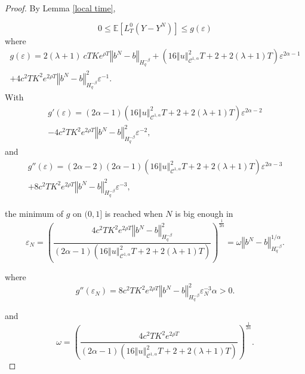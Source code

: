 \documentclass[12pt]{article}
\newcommand{\norme}[1]{\left\Vert #1\right\Vert}
\newcommand{\E}{\mathbb{E}}
\begin{document}
\begin{proof}
    By Lemma \ref{local time},
    
    \begin{equation*}
    0\leq\E\left[L^0_T(Y-Y^N)\right]\leq g(\varepsilon)
    \end{equation*}
    where \begin{multline*}
    g(\varepsilon) = 2(\lambda + 1)\ cT Ke^{\rho T}\norme{b^N-b}_{H^{-\beta}_{q}} + \left(16\norme{u}_{\mathcal{C}^{1,\alpha}}^2 T + 2 + 2(\lambda + 1)T\right) \varepsilon^{2\alpha-1}\\
    + 4c^2T K^2e^{2\rho T}\norme{b^N-b}_{H^{-\beta}_{q}}^2\varepsilon^{-1}.
    \end{multline*}    
    With \begin{multline*}
    g'(\varepsilon)=(2\alpha-1)\left(16\norme{u}_{\mathcal{C}^{1,\alpha}}^2 T + 2 + 2(\lambda + 1)T\right)\varepsilon^{2\alpha-2}\\-4c^2T K^2e^{2\rho T}\norme{b^N-b}_{H^{-\beta}_{q}}^2\varepsilon^{-2},
    \end{multline*}
    and 
    \begin{multline*}
    g''(\varepsilon)=(2\alpha-2)(2\alpha-1)\left(16\norme{u}_{\mathcal{C}^{1,\alpha}}^2 T + 2 + 2(\lambda + 1)T\right)\varepsilon^{2\alpha-3}\\+8c^2T K^2e^{2\rho T}\norme{b^N-b}_{H^{-\beta}_{q}}^2\varepsilon^{-3},\end{multline*}
    
    the minimum of $g$ on $(0,1]$ is reached when $N$ is big enough in \begin{equation*}
    \varepsilon_N=\left(\frac{4c^2T K^2e^{2\rho T}\norme{b^N-b}_{H^{-\beta}_{q}}^2}{(2\alpha-1)\left(16\norme{u}_{\mathcal{C}^{1,\alpha}}^2 T + 2 + 2(\lambda + 1)T\right)}\right)^{\frac{1}{2\alpha}}=\omega \norme{b^N-b}_{H^{-\beta}_{q}}^{1/\alpha}.
    \end{equation*}
    
    where 
    \begin{equation*}
    g''(\varepsilon_N)
    =8c^2T K^2e^{2\rho T}\norme{b^N-b}_{H^{-\beta}_{q}}^2\varepsilon_N^{-3}\alpha>0.
    \end{equation*}
    
    and \begin{equation*}
    \omega = \left(\frac{4c^2T K^2e^{2\rho T}}{(2\alpha-1)\left(16\norme{u}_{\mathcal{C}^{1,\alpha}}^2 T + 2 + 2(\lambda + 1)T\right)}\right)^{\frac{1}{2\alpha}}.
    \end{equation*}
    

\end{proof}
\end{document}
